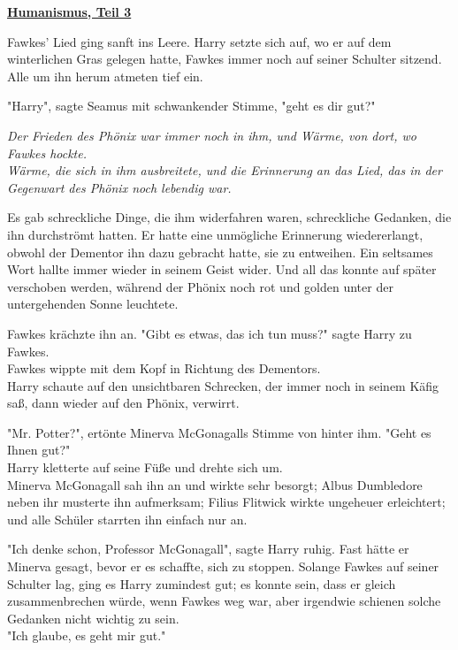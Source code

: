 

\hypertarget{humanismus-teil-3}{%

\textbf{\uline{Humanismus, Teil 3}}

Fawkes' Lied ging sanft ins Leere. Harry setzte sich auf, wo er auf dem winterlichen Gras gelegen hatte, Fawkes immer noch auf seiner Schulter sitzend. Alle um ihn herum atmeten tief ein.

"Harry", sagte Seamus mit schwankender Stimme, "geht es dir gut?"

\emph{Der Frieden des Phönix war immer noch in ihm, und Wärme, von dort, wo Fawkes hockte.\\ Wärme, die sich in ihm ausbreitete, und die Erinnerung an das Lied, das in der Gegenwart des Phönix noch lebendig war.}

Es gab schreckliche Dinge, die ihm widerfahren waren, schreckliche Gedanken, die ihn durchströmt hatten. Er hatte eine unmögliche Erinnerung wiedererlangt, obwohl der Dementor ihn dazu gebracht hatte, sie zu entweihen. Ein seltsames Wort hallte immer wieder in seinem Geist wider. Und all das konnte auf später verschoben werden, während der Phönix noch rot und golden unter der untergehenden Sonne leuchtete.

Fawkes krächzte ihn an. "Gibt es etwas, das ich tun muss?" sagte Harry zu Fawkes.\\ Fawkes wippte mit dem Kopf in Richtung des Dementors.\\ Harry schaute auf den unsichtbaren Schrecken, der immer noch in seinem Käfig saß, dann wieder auf den Phönix, verwirrt.

"Mr. Potter?", ertönte Minerva McGonagalls Stimme von hinter ihm. "Geht es Ihnen gut?"\\ Harry kletterte auf seine Füße und drehte sich um.\\ Minerva McGonagall sah ihn an und wirkte sehr besorgt; Albus Dumbledore neben ihr musterte ihn aufmerksam; Filius Flitwick wirkte ungeheuer erleichtert; und alle Schüler starrten ihn einfach nur an.

"Ich denke schon, Professor McGonagall", sagte Harry ruhig. Fast hätte er Minerva gesagt, bevor er es schaffte, sich zu stoppen. Solange Fawkes auf seiner Schulter lag, ging es Harry zumindest gut; es konnte sein, dass er gleich zusammenbrechen würde, wenn Fawkes weg war, aber irgendwie schienen solche Gedanken nicht wichtig zu sein.\\ "Ich glaube, es geht mir gut."

}
